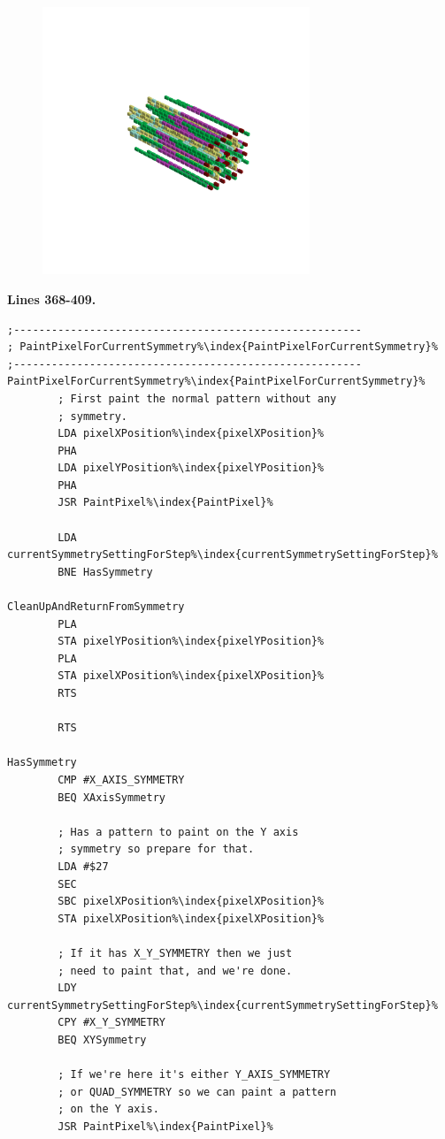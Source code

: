 \begin{minipage}[b]{0.50\linewidth}
\begin{figure}[H]
        \vspace*{-8cm}
        \hspace*{2cm}
        \includegraphics[width=8cm]{src/symmetries/pattern9_4-45.png}
        \vspace*{-2.5cm}
  \caption*{}
  \end{figure}
\end{minipage}

\clearpage
\textbf{Lines 368-409. }
\begin{lstlisting}[escapechar=\%]
;-------------------------------------------------------
; PaintPixelForCurrentSymmetry%\index{PaintPixelForCurrentSymmetry}%
;-------------------------------------------------------
PaintPixelForCurrentSymmetry%\index{PaintPixelForCurrentSymmetry}%   
        ; First paint the normal pattern without any
        ; symmetry.
        LDA pixelXPosition%\index{pixelXPosition}%
        PHA 
        LDA pixelYPosition%\index{pixelYPosition}%
        PHA 
        JSR PaintPixel%\index{PaintPixel}%

        LDA currentSymmetrySettingForStep%\index{currentSymmetrySettingForStep}%
        BNE HasSymmetry

CleanUpAndReturnFromSymmetry   
        PLA 
        STA pixelYPosition%\index{pixelYPosition}%
        PLA 
        STA pixelXPosition%\index{pixelXPosition}%
        RTS 

        RTS

HasSymmetry   
        CMP #X_AXIS_SYMMETRY
        BEQ XAxisSymmetry

        ; Has a pattern to paint on the Y axis
        ; symmetry so prepare for that.
        LDA #$27
        SEC 
        SBC pixelXPosition%\index{pixelXPosition}%
        STA pixelXPosition%\index{pixelXPosition}%

        ; If it has X_Y_SYMMETRY then we just 
        ; need to paint that, and we're done.
        LDY currentSymmetrySettingForStep%\index{currentSymmetrySettingForStep}%
        CPY #X_Y_SYMMETRY
        BEQ XYSymmetry

        ; If we're here it's either Y_AXIS_SYMMETRY
        ; or QUAD_SYMMETRY so we can paint a pattern
        ; on the Y axis.
        JSR PaintPixel%\index{PaintPixel}%

\end{lstlisting}
\clearpage

